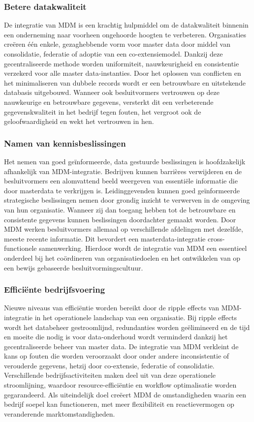 \subsubsection{Betere datakwaliteit}
De integratie van MDM is een krachtig hulpmiddel om de datakwaliteit binnenin een onderneming naar voorheen ongehoorde hoogten te verbeteren. Organisaties creëren één enkele, gezaghebbende vorm voor master data door middel van consolidatie, federatie of adoptie van een co-extensiemodel. Dankzij deze gecentraliseerde methode worden uniformiteit, nauwkeurigheid en consistentie verzekerd voor alle master data-instanties. Door het oplossen van conflicten en het minimaliseren van dubbele records wordt er een betrouwbare en uitstekende databasis uitgebouwd. Wanneer ook besluitvormers vertrouwen op deze nauwkeurige en betrouwbare gegevens, versterkt dit een verbeterende gegevenskwaliteit in het bedrijf tegen fouten, het vergroot ook de geloofwaardigheid en wekt het vertrouwen in hen.

\subsubsection{Namen van kennisbeslissingen}
Het nemen van goed geïnformeerde, data gestuurde beslissingen is hoofdzakelijk afhankelijk van MDM-integratie. Bedrijven kunnen barrières verwijderen en de besluitvormers een alomvattend beeld weergeven van essentiële informatie die door masterdata te verkrijgen is. Leidinggevenden kunnen goed geïnformeerde strategische beslissingen nemen door grondig inzicht te verwerven in de omgeving van hun organisatie. Wanneer zij dan toegang hebben tot de betrouwbare en consistente gegevens kunnen beslissingen doordachter gemaakt worden. Door MDM werken besluitvormers allemaal op verschillende afdelingen met dezelfde, meeste recente informatie. Dit bevordert een masterdata-integratie cross-functionele samenwerking. Hierdoor wordt de integratie van MDM een essentieel onderdeel bij het coördineren van organisatiedoelen en het ontwikkelen van op een bewijs gebaseerde besluitvormingscultuur.

\subsubsection{Efficiënte bedrijfsvoering }

Nieuwe niveaus van efficiëntie worden bereikt door de ripple effects van MDM-integratie in het operationele landschap van een organisatie. Bij ripple effects wordt het databeheer gestroomlijnd, redundanties worden geëlimineerd en de tijd en moeite die nodig is voor data-onderhoud wordt verminderd dankzij het gecentraliseerde beheer van master data. De integratie van MDM verkleint de kans op fouten die worden veroorzaakt door onder andere inconsistentie of verouderde gegevens, hetzij door co-extensie, federatie of consolidatie. Verschillende bedrijfsactiviteiten maken deel uit van deze operationele stroomlijning, waardoor resource-efficiëntie en workflow optimalisatie worden gegarandeerd. Als uiteindelijk doel creëert MDM de omstandigheden waarin een bedrijf soepel kan functioneren, met meer flexibiliteit en reactievermogen op veranderende marktomstandigheden.

